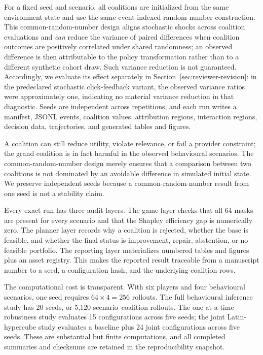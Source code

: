 \documentclass[pdflatex,sn-mathphys-num]{sn-jnl}
\theoremstyle{thmstyleone}
\theoremstyle{thmstyletwo}
\theoremstyle{thmstylethree}
\begin{document}
For a fixed seed and scenario, all coalitions are initialized from the same environment state and use the same event-indexed random-number construction. This common-random-number design aligns stochastic shocks across coalition evaluations and \emph{can} reduce the variance of paired differences when coalition outcomes are positively correlated under shared randomness; an observed difference is then attributable to the policy transformation rather than to a different synthetic cohort draw. Such variance reduction is not guaranteed. Accordingly, we evaluate its effect separately in Section~\ref{sec:reviewer-revision}: in the predeclared stochastic click-feedback variant, the observed variance ratios were approximately one, indicating no material variance reduction in that diagnostic. Seeds are independent across repetitions, and each run writes a manifest, JSONL events, coalition values, attribution regions, interaction regions, decision data, trajectories, and generated tables and figures.

A coalition can still reduce utility, violate relevance, or fail a provider constraint; the grand coalition is in fact harmful in the observed behavioural scenarios. The common-random-number design merely ensures that a comparison between two coalitions is not dominated by an avoidable difference in simulated initial state. We preserve independent seeds because a common-random-number result from one seed is not a stability claim.

Every exact run has three audit layers. The game layer checks that all 64 masks are present for every scenario and that the Shapley efficiency gap is numerically zero. The planner layer records why a coalition is rejected, whether the base is feasible, and whether the final status is improvement, repair, abstention, or no feasible portfolio. The reporting layer materializes numbered tables and figures plus an asset registry. This makes the reported result traceable from a manuscript number to a seed, a configuration hash, and the underlying coalition rows.

The computational cost is transparent. With six players and four behavioural scenarios, one seed requires $64\times4=256$ rollouts. The full behavioural inference study has 20 seeds, or 5,120 scenario--coalition rollouts. The one-at-a-time robustness study evaluates 15 configurations across five seeds; the joint Latin-hypercube study evaluates a baseline plus 24 joint configurations across five seeds. These are substantial but finite computations, and all completed summaries and checksums are retained in the reproducibility snapshot.
\end{document}
